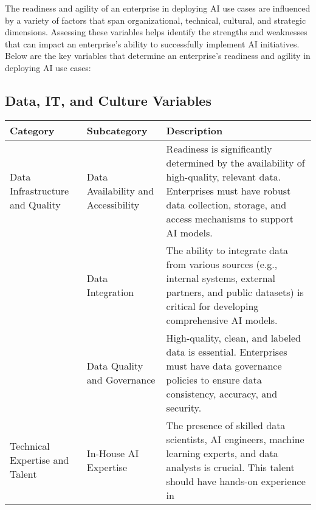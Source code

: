 The readiness and agility of an enterprise in deploying AI use cases are
influenced by a variety of factors that span organizational, technical,
cultural, and strategic dimensions. Assessing these variables helps
identify the strengths and weaknesses that can impact an enterprise's
ability to successfully implement AI initiatives. Below are the key
variables that determine an enterprise's readiness and agility in
deploying AI use cases:

\subsection{Data, IT, and Culture
Variables}\label{data-it-and-culture-variables}

\begin{longtable}[]{@{}
  >{\raggedright\arraybackslash}p{}
  >{\raggedright\arraybackslash}p{}
  >{\raggedright\arraybackslash}p{}@{}}
\toprule\noalign{}
\begin{minipage}[b]{\linewidth}\raggedright
Category
\end{minipage} & \begin{minipage}[b]{\linewidth}\raggedright
Subcategory
\end{minipage} & \begin{minipage}[b]{\linewidth}\raggedright
Description
\end{minipage} \\
\midrule\noalign{}
\endhead
\bottomrule\noalign{}
\endlastfoot
Data Infrastructure and Quality & Data Availability and Accessibility &
Readiness is significantly determined by the availability of
high-quality, relevant data. Enterprises must have robust data
collection, storage, and access mechanisms to support AI models. \\
& Data Integration & The ability to integrate data from various sources
(e.g., internal systems, external partners, and public datasets) is
critical for developing comprehensive AI models. \\
& Data Quality and Governance & High-quality, clean, and labeled data is
essential. Enterprises must have data governance policies to ensure data
consistency, accuracy, and security. \\
Technical Expertise and Talent & In-House AI Expertise & The presence of
skilled data scientists, AI engineers, machine learning experts, and
data analysts is crucial. This talent should have hands-on experience in

\end{longtable}
